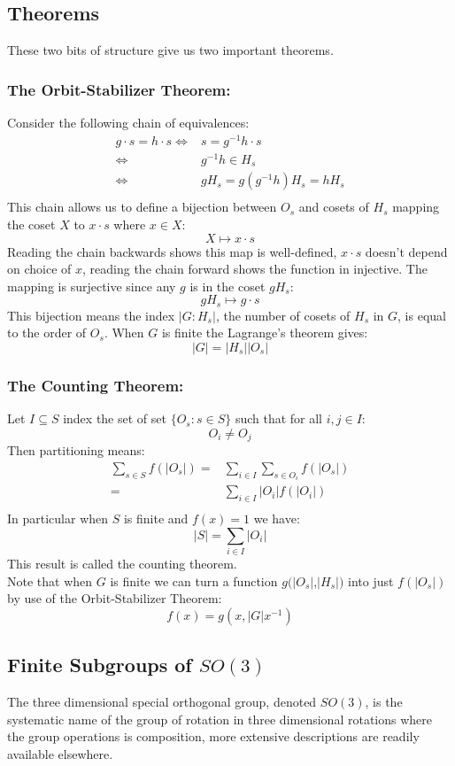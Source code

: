 \subsection{Theorems}
These two bits of structure give us two important theorems.

\subsubsection{The Orbit-Stabilizer Theorem:}
Consider the following chain of equivalences:
\[\begin{aligned}
	g\cdot s = h\cdot s \Leftrightarrow& s=g^{-1}h\cdot s\\
	\Leftrightarrow& g^{-1}h\in H_s\\
	\Leftrightarrow& gH_s = g(g^{-1}h)H_s = hH_s\\
\end{aligned}\]
This chain allows us to define a bijection between $O_s$ and  cosets of $H_s$ mapping the coset $X$ to $x\cdot s$ where $x\in X$:
\[X\mapsto x\cdot s\]
Reading the chain backwards shows this map is well-defined,
$x\cdot s$ doesn't depend on choice of $x$,
reading the chain forward shows the function in injective.
The mapping is surjective since any $g$ is in the coset $gH_s$:
\[gH_s\mapsto g\cdot s\]
This bijection means the index $|G:H_s|$,
the number of cosets of $H_s$ in $G$,
is equal to the order of $O_s$.
When $G$ is finite the Lagrange's theorem gives:
\[|G| = |H_s||O_s|\]

\subsubsection{The Counting Theorem:}
Let $I\subseteq S$ index the set of set $\{O_s:s\in S\}$ such that for all $i,j\in I$:
\[ O_i \neq O_j\]
Then partitioning means:
\[\begin{aligned}
	\sum_{s\in S}f(|O_s|) =& \sum_{i\in I}\sum_{s\in O_i}f(|O_s|)\\
	=&\sum_{i\in I}|O_i|f(|O_i|)\\
\end{aligned}\]
In particular when $S$ is finite and $f(x)=1$ we have:
\[|S| = \sum_{i\in I}|O_i|\]
This result is called the counting theorem.
\\

Note that when $G$ is finite we can turn a function $g(|O_s|$,$|H_s|)$ into just $f(|O_s|)$ by use of the Orbit-Stabilizer Theorem:
\[f(x) = g(x,|G|x^{-1})\]

\subsection{Finite Subgroups of $SO(3)$}
The three dimensional special orthogonal group,
denoted $SO(3)$,
is the systematic name of the group of rotation in three dimensional rotations where the group operations is composition,
more extensive descriptions are readily available elsewhere.
\\


